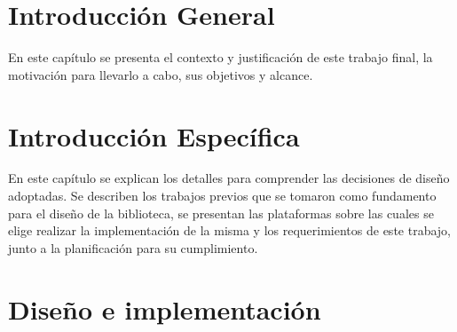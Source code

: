 \documentclass[
11pt, %
spanish,
singlespacing, %
parskip, %
headsepline, %
]{MastersDoctoralThesis} %
\begin{document}
\newcommand{\titulo}[1]{\bigskip \noindent\textbf{#1} \\} %
\newcommand{\subtitulo}[1]{\bigskip \noindent\textit{#1} \\} %



\chapter{Introducción General}
\label{ChapterIntroGral}

En este capítulo se presenta el contexto y justificación de este trabajo final, la motivación para llevarlo a cabo, sus objetivos y alcance.





\chapter{Introducción Específica}
\label{ChapterIntroEsp}

En este capítulo se explican los detalles para comprender las decisiones de diseño adoptadas. Se describen los trabajos previos que se tomaron como fundamento para el diseño de la biblioteca, se presentan las plataformas sobre las cuales se elige realizar la implementación de la misma y los requerimientos de este trabajo, junto a la planificación para su cumplimiento.


 
 
 
 

\chapter{Diseño e implementación}
\label{ChapterDiseno}
\end{document}
